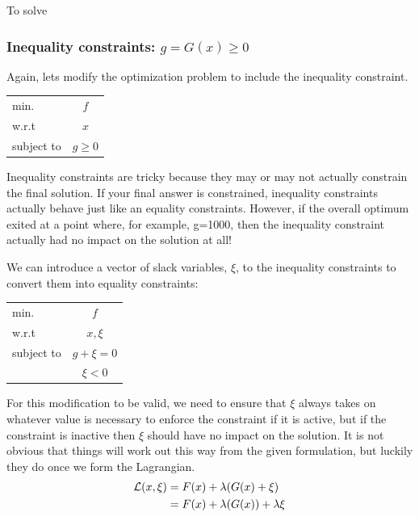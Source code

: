 \documentclass[conf]{new-aiaa}
\begin{document}
        To solve 


        \subsubsection{Inequality constraints: $g = G(x) \ge 0$}

        Again, lets modify the optimization problem to include the inequality constraint. 
        \begin{table}[H]
            \centering
            \begin{tabular}{lc}
                \hline
                min. & $f$ \\
                w.r.t & $x$ \\ 
                subject to & $g \ge 0$ \\ \hline 
            \end{tabular}
        \end{table}

        Inequality constraints are tricky because they may or may not actually constrain the final solution. 
        If your final answer is constrained, inequality constraints actually behave just like an equality constraints. 
        However, if the overall optimum exited at a point where, for example, g=1000, then the inequality constraint actually had no impact on the solution at all! 

        We can introduce a vector of slack variables, $\xi$, to the inequality constraints to convert them into equality constraints: 
        \begin{table}[H]
            \centering
            \begin{tabular}{lc}
                \hline
                min. & $f$ \\
                w.r.t & $x, \xi$ \\ 
                subject to & $g + \xi = 0$ \\ 
                           & $\xi < 0$ \\ \hline
            \end{tabular}
        \end{table}
        For this modification to be valid, we need to ensure that $\xi$ always takes on whatever value is necessary to enforce the constraint if it is active, but if the constraint is inactive then $\xi$ should have no impact on the solution. 
        It is not obvious that things will work out this way from the given formulation, but luckily they do once we form the Lagrangian. 
        \begin{align}
            \mathcal{L}(x,\xi) &= F(x) + \lambda(G(x) + \xi) \notag \\
                               &= F(x) + \lambda(G(x)) + \lambda \xi \label{eq:L_ineq}
        \end{align}
\end{document}
